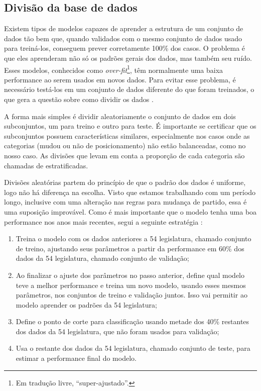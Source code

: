 \documentclass[a4paper,titlepage]{ppgi}\usepackage[]{graphicx}\usepackage[]{color}
\begin{document}
\subsection{Divisão da base de dados}
\label{cap:desenvolvimento:divisao-dados}


Existem tipos de modelos capazes de aprender a estrutura de um conjunto de
dados tão bem que, quando validados com o mesmo conjunto de dados usado para
treiná-los, conseguem prever corretamente 100\% dos casos. O problema é que
eles aprenderam não só os padrões gerais dos dados, mas também seu ruído. Esses
modelos, conhecidos como \emph{over-fit}\footnote{Em tradução livre,
``super-ajustado''.}, têm normalmente uma baixa performance ao serem usados em
novos dados. Para evitar esse problema, é necessário testá-los em um conjunto
de dados diferente do que foram treinados, o que gera a questão sobre como
dividir os dados \cite{Kuhn2013}.

A forma mais simples é dividir aleatoriamente o conjunto de dados em dois
subconjuntos, um para treino e outro para teste. É importante se certificar que
os subconjuntos possuem características similares, especialmente nos casos onde
as categorias (mudou ou não de posicionamento) não estão balanceadas, como no
nosso caso. As divisões que levam em conta a proporção de cada categoria são
chamadas de estratificadas.

Divisões aleatórias partem do princípio de que o padrão dos dados é uniforme,
logo não há diferença na escolha. Visto que estamos trabalhando com um período
longo, inclusive com uma alteração nas regras para mudança de partido, essa é
uma suposição improvável. Como é mais importante que o modelo tenha uma boa
performance nos anos mais recentes, segui a seguinte estratégia \cite{Kuhn2013}:

\begin{enumerate}
\item Treina o modelo com os dados anteriores a 54\textordfeminine{}
legislatura, chamado conjunto de treino, ajustando seus parâmetros a partir
da performance em 60\% dos dados da 54\textordfeminine{} legislatura, chamado
conjunto de validação;
\item Ao finalizar o ajuste dos parâmetros no passo anterior, define qual
modelo teve a melhor performance e treina um novo modelo, usando esses mesmos
parâmetros, nos conjuntos de treino e validação juntos. Isso vai permitir ao
modelo aprender os padrões da 54\textordfeminine{} legislatura;
\item Define o ponto de corte para classificação usando metade dos 40\%
restantes dos dados da 54\textordfeminine{} legislatura, que não foram usados
para validação;
\item Usa o restante dos dados da 54\textordfeminine{} legislatura, chamado
conjunto de teste, para estimar a performance final do modelo.
\end{enumerate}
\end{document}
